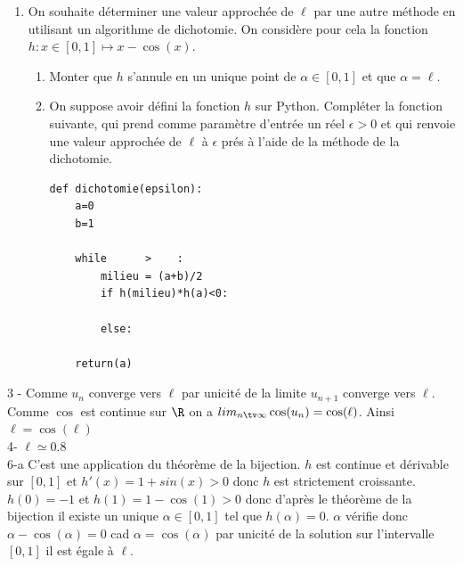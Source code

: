 \begin{probleme}[Informatique]
\begin{enumerate}
\begin{enumerate}
\end{enumerate}
\item On souhaite déterminer une valeur approchée de $\ell $ par une autre méthode en utilisant un algorithme de dichotomie. On considère pour cela la fonction $h : x \in [0,1] \mapsto x- \cos(x).$
\begin{enumerate}
\item Monter que $h$ s'annule en un unique point de $\alpha \in [0,1]$ et que $\alpha =\ell$. 
\item On suppose avoir défini la fonction $h$ sur Python. Compléter la fonction suivante, qui prend comme paramètre d'entrée un réel $\epsilon>0$ et qui renvoie une valeur approchée de $\ell$ à $\epsilon $ prés à l'aide de la méthode de la dichotomie. 
\begin{lstlisting}
def dichotomie(epsilon):
    a=0
    b=1

    while      >    :
        milieu = (a+b)/2
        if h(milieu)*h(a)<0:
            
        else:
            
    return(a)
\end{lstlisting}


\end{enumerate}
\end{enumerate}




\end{probleme}

\begin{correction}
3 - Comme $u_n$ converge vers $\ell$ par unicité de la limite $u_{n+1}$ converge vers $\ell$. Comme $\cos$ est continue sur $\R$ on a 
$lim_{n\tv\infty} \cos(u_n) = \cos(\ell)$. Ainsi $\ell =\cos(\ell)$\\
4- $\ell \simeq 0.8$\\
6-a C'est une application du théorème de la bijection. 
$h$ est continue et dérivable sur $[0,1]$ et $h'(x) = 1+sin(x) >0$ donc $h$ est strictement croissante. $h(0)=-1$ et $h(1)= 1-\cos(1)>0 $ donc d'après le théorème de la bijection il existe un unique $\alpha \in [0,1]$ tel que $h(\alpha) =0$. 
$\alpha$ vérifie donc $\alpha-\cos(\alpha)=0$ cad $\alpha =\cos(\alpha)$ par unicité de la solution sur l'intervalle $[0,1]$ il est égale à $\ell$. 

\end{correction}